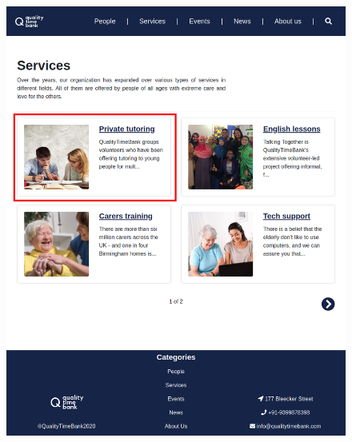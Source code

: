 \documentclass[a4paper, 11pt, parskip=half, headsepline]{scrreprt}
\begin{document}
\begin{figure}[H]
\begin{minipage}[t]{0.5\textwidth}
    	\includegraphics[width=1\linewidth, keepaspectratio]{scenarios/scenario-12}
    	\caption{}
    	\label{fig:scenario-12}
    \end{minipage}
\end{figure}
\end{document}
